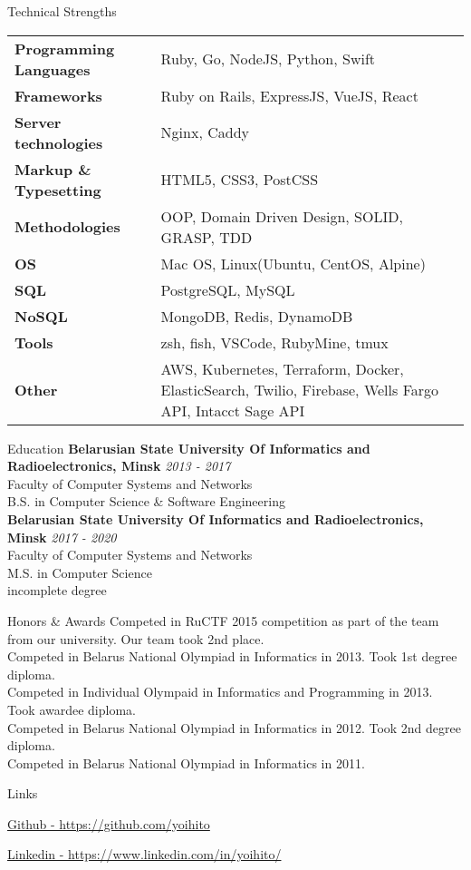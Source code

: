 \documentclass{resume}
\begin{document}
  \begin{rSection}{Technical Strengths}
    \begin{tabular}{ @{} >{\bfseries}l @{\hspace{6ex}} l }
      Programming Languages & Ruby, Go, NodeJS, Python, Swift \\
      Frameworks            & Ruby on Rails, ExpressJS, VueJS, React \\
      Server technologies   & Nginx, Caddy \\
      Markup \& Typesetting & HTML5, CSS3, PostCSS \\
      Methodologies         & OOP, Domain Driven Design, SOLID, GRASP, TDD \\
      OS                    & Mac OS, Linux(Ubuntu, CentOS, Alpine) \\
      SQL                   & PostgreSQL, MySQL \\
      NoSQL                 & MongoDB, Redis, DynamoDB \\
      Tools                 & zsh, fish, VSCode, RubyMine, tmux \\
      Other                 & AWS, Kubernetes, Terraform, Docker, ElasticSearch, Twilio, Firebase, Wells Fargo API, Intacct Sage API \\
    \end{tabular}
  \end{rSection}

  \begin{rSection}{Education}
    {\bf Belarusian State University Of Informatics and Radioelectronics, Minsk} \hfill {\em 2013 - 2017} \\
    { Faculty of Computer Systems and Networks } \\
    { B.S. in Computer Science \& Software Engineering } \\
    {\bf Belarusian State University Of Informatics and Radioelectronics, Minsk} \hfill {\em 2017 - 2020} \\
    { Faculty of Computer Systems and Networks } \\
    { M.S. in Computer Science } \\
    { incomplete degree } \\
  \end{rSection}

  \begin{rSection}{Honors \& Awards}
  {Competed in RuCTF 2015 competition as part of the team from our university. Our team took 2nd place.} \\
  {Competed in Belarus National Olympiad in Informatics in 2013. Took 1st degree diploma.} \\
  {Competed in Individual Olympaid in Informatics and Programming in 2013. Took awardee diploma.} \\
  {Competed in Belarus National Olympiad in Informatics in 2012. Took 2nd degree diploma.} \\
  {Competed in Belarus National Olympiad in Informatics in 2011.}
  \end{rSection}

  \begin{rSection}{Links}
  \item \href{https://github.com/yoihito}{Github - https://github.com/yoihito}
  \item \href{https://www.linkedin.com/in/yoihito/}{Linkedin - https://www.linkedin.com/in/yoihito/}
  \end{rSection}
\end{document}
